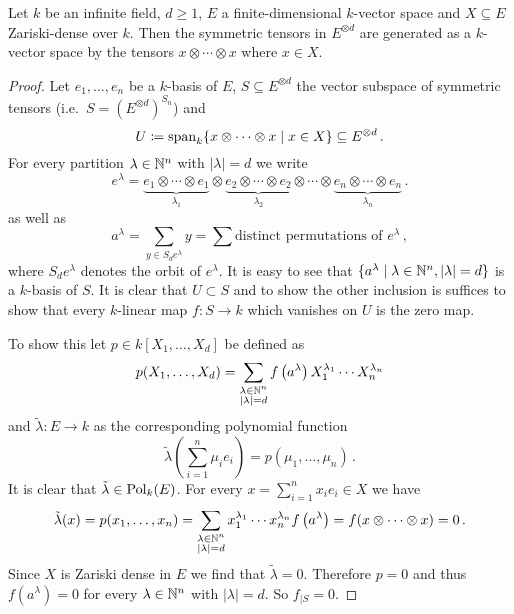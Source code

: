 \begin{lem}\label{lem: symmetric tensors and zariski dense subsets}
  Let $k$ be an infinite field, $d \geq 1$, $E$ a finite-dimensional $k$-vector space and $X \subseteq E$ Zariski-dense over $k$.
  Then the symmetric tensors in $E^{\otimes d}$ are generated as a $k$-vector space by the tensors $x \otimes \dotsb \otimes x$ where $x \in X$.
\end{lem}
\begin{proof}
  Let $e_1, \dotsc, e_n$ be a $k$-basis of $E$, $S \subseteq E^{\otimes d}$ the vector subspace of symmetric tensors (i.e.\ $S = (E^{\otimes d})^{S_n}$) and
  \[
              U
    \coloneqq \operatorname{span}_k \{ x \otimes \dotsb \otimes x \mid x \in X \}
    \subseteq E^{\otimes d} \,.
  \]
  For every partition $\lambda \in \mathbb{N}^n$ with $|\lambda| = d$ we write
  \[
      e^\lambda
    =         \underbrace{e_1 \otimes \dotsb \otimes e_1}_{\lambda_1}
      \otimes \underbrace{e_2 \otimes \dotsb \otimes e_2}_{\lambda_2}
      \otimes \dotsb
      \otimes \underbrace{e_n \otimes \dotsb \otimes e_n}_{\lambda_n} \,.
  \]
  as well as
  \[
      a^\lambda
    = \sum_{y \in S_d e^\lambda} y
    = \sum \text{distinct permutations of $e^\lambda$} \,,
  \]
  where $S_d e^\lambda$ denotes the orbit of $e^\lambda$.
  It is easy to see that $\{ a^\lambda \mid \lambda \in \mathbb{N}^n, |\lambda| = d \}$ is a $k$-basis of $S$.
  It is clear that $U \subset S$ and to show the other inclusion is suffices to show that every $k$-linear map $f \colon S \to k$ which vanishes on $U$ is the zero map.
  
  To show this let $p \in k[X_1, \dotsc, X_d]$ be defined as
  \[
      p(X_1, \dotsc, X_d)
    = \sum_{\substack{\lambda \in \mathbb{N}^n \\ |\lambda| = d}}
        f\left( a^\lambda \right)
        X_1^{\lambda_1} \dotsm X_n^{\lambda_n}
  \]
  and $\tilde{\lambda} \colon E \to k$ as the corresponding polynomial function
  \[
      \tilde{\lambda}\left( \sum_{i=1}^n \mu_i e_i \right)
    = p(\mu_1, \dotsc, \mu_n) \,.
  \]
  It is clear that $\tilde{\lambda} \in \operatorname{Pol}_k(E)$.
  For every $x = \sum_{i=1}^n x_i e_i \in X$ we have
  \[
      \tilde{\lambda}(x)
    = p(x_1, \dotsc, x_n)
    = \sum_{\substack{\lambda \in \mathbb{N}^n \\ |\lambda| = d}}
        x_1^{\lambda_1} \dotsm x_n^{\lambda_n}
        f\left( a^\lambda \right) 
    = f(x \otimes \dotsb \otimes x)
    = 0 \,.
  \]
  Since $X$ is Zariski dense in $E$ we find that $\tilde{\lambda} = 0$.
  Therefore $p = 0$ and thus $f(a^\lambda) = 0$ for every $\lambda \in \mathbb{N}^n$ with $|\lambda| = d$.
  So $f_{|S} = 0$.
\end{proof}


